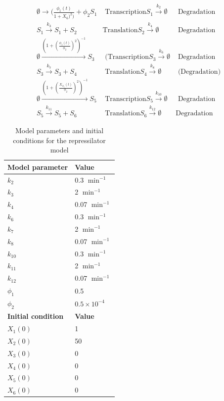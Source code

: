 \documentclass[11pt]{isr} %
\begin{document}
\begin{align*}
    \emptyset \rightarrow{(\frac{\phi_1(t)}{1+X_6)^2)} + \phi_2} S_1 &\text{ Transcription}
    S_1  \xrightarrow{k_2} \emptyset &\text{ Degradation} \\
    
    S_1  \xrightarrow{k_3} S_1 + S_2 &\text{Translation} 
    S_2  \xrightarrow{k_4} \emptyset &\text{ Degradation} \\
    \emptyset  \xrightarrow{(1 + (\frac{{\phi_{1}}(t)}{\phi_2})^2)^{-1}} S_3 &\text{ (Transcription} 
    S_3  \xrightarrow{k_6} \emptyset &\text{ Degradation} \\
    S_3  \xrightarrow{k_7} S_3 + S_4 &\text{ Translation} 
    S_4  \xrightarrow{k_8} \emptyset &\text{ (Degradation)} \\
    \emptyset  \xrightarrow{(1 + (\frac{X_{\phi_{1}}(t)}{\phi_2})^2)^{-1}} S_5 &\text{ Transcription} 
    S_5  \xrightarrow{k_{10}} \emptyset &\text{ Degradation} \\
    S_5  \xrightarrow{k_{11}} S_5 + S_6 &\text{ Translation} 
    S_6  \xrightarrow{k_{12}} \emptyset &\text{Degradation}
\end{align*}

\begin{table}[h]
\centering
\begin{tabular}{@{}ll@{}}
\toprule
\textbf{Model parameter} & \textbf{Value} \\ 
\midrule
\( k_2 \) & 0.3 \( \min^{-1} \) \\
\( k_3 \) & 2 \( \min^{-1} \) \\
\( k_4 \) & 0.07 \( \min^{-1} \) \\
\( k_6 \) & 0.3 \( \min^{-1} \) \\
\( k_7 \) & 2 \( \min^{-1} \) \\
\( k_8 \) & 0.07 \( \min^{-1} \) \\
\( k_{10} \) & 0.3 \( \min^{-1} \) \\
\( k_{11} \) & 2 \( \min^{-1} \) \\
\( k_{12} \) & 0.07 \( \min^{-1} \) \\
\( \phi_1 \) & 0.5 \\
\( \phi_2 \) & \( 0.5 \times 10^{-4} \) \\
\midrule
\textbf{Initial condition} & \textbf{Value} \\ 
\midrule
\( X_1(0) \) & 1 \\
\( X_2(0) \) & 50 \\
\( X_3(0) \) & 0 \\
\( X_4(0) \) & 0 \\
\( X_5(0) \) & 0 \\
\( X_6(0) \) & 0 \\
\bottomrule
\end{tabular}
\caption{Model parameters and initial conditions for the repressilator model}
\end{table}
\end{document}
